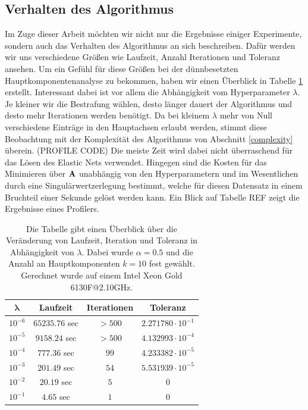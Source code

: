 

\subsection{Verhalten des Algorithmus}

Im Zuge dieser Arbeit möchten wir nicht nur die Ergebnisse einiger Experimente, sondern auch das Verhalten des Algorithmus an sich beschreiben. Dafür werden wir uns verschiedene Größen wie Laufzeit, Anzahl Iterationen und Toleranz ansehen. Um ein Gefühl für diese Größen bei der dünnbesetzten Hauptkomponentenanalyse zu bekommen, haben wir einen Überblick in Tabelle \ref{algorithm_analysis_table} erstellt. Interessant dabei ist vor allem die Abhängigkeit vom Hyperparameter $\lambda$. Je kleiner wir die Bestrafung wählen, desto länger dauert der Algorithmus und desto mehr Iterationen werden benötigt. Da bei kleinem $\lambda$ mehr von Null verschiedene Einträge in den Hauptachsen erlaubt werden, stimmt diese Beobachtung mit der Komplexität des Algorithmus von Abschnitt \ref{complexity} überein. (PROFILE CODE) Die meiste Zeit wird dabei nicht überraschend für das Lösen des Elastic Nets verwendet. Hingegen sind die Kosten für das Minimieren über $\mathbf{A}$ unabhängig von den Hyperparametern und im Wesentlichen durch eine Singulärwertzerlegung bestimmt, welche für diesen Datensatz in einem Bruchteil einer Sekunde gelöst werden kann. Ein Blick auf Tabelle REF zeigt die Ergebnisse eines Profilers.

\setlength{\tabcolsep}{12pt}
\begin{table}
\centering
\label{algorithm_analysis_table}
\begin{tabular}{cccc}
$\bm{\lambda}$ & \textbf{Laufzeit} & \textbf{Iterationen} & \textbf{Toleranz}\\\hline\addlinespace
$10^{-6}$ & $65235.76$ sec & $>500$ & $2.271780 \cdot 10^{-1}$\\
$10^{-5}$ & $9158.24$ sec & $>500$ & $4.132993 \cdot 10^{-4}$\\
$10^{-4}$ & $777.36$ sec & $99$ & $4.233382 \cdot 10^{-5}$\\
$10^{-3}$ & $201.49$ sec & $54$ & $5.531939 \cdot 10^{-5}$\\
$10^{-2}$ & $20.19$ sec & $5$ & $0$\\
$10^{-1}$ & $4.65$ sec & $1$ & $0$\\
\end{tabular}
\caption{Die Tabelle gibt einen Überblick über die Veränderung von Laufzeit, Iteration und Toleranz in Abhängigkeit von $\lambda$. Dabei wurde $\alpha=0.5$ und die Anzahl an Hauptkomponenten $k=10$ fest gewählt.\\Gerechnet wurde auf einem Intel Xeon Gold 6130F@2.10GHz.}
\end{table}
\setlength{\tabcolsep}{6pt}

